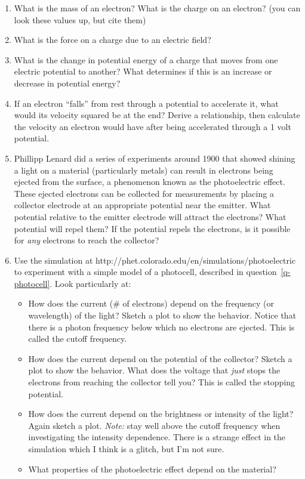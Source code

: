 \documentclass{tufte-handout}
\begin{document}
\begin{enumerate}

\item What is the mass of an electron? What is the charge on an electron? (you can look these values up, but cite them)

\item What is the force on a charge due to an electric field?

\item What is the change in potential energy of a charge that moves from one electric potential to another?  What determines if this is an increase or decrease in potential energy?

\item \label{q-velocity} If an electron ``falls'' from rest through a potential to accelerate it, what would its velocity squared be at the end? Derive a relationship, then calculate the velocity an electron would have after
being accelerated through a 1 volt potential.


\item \label{q-photocell} Phillipp Lenard did a series of experiments around 1900 that showed shining a light on a material (particularly metals) can result in electrons being ejected from the surface, a phenomenon known as the photoelectric effect.  These ejected electrons can be collected for measurements by placing a collector electrode at an appropriate potential near the emitter.  What potential relative to the emitter electrode will attract the electrons?  What potential will repel them?  If the potential repels the electrons, is it possible for {\em any} electrons to reach the collector?

\item Use the simulation at http://phet.colorado.edu/en/simulations/photoelectric to experiment with a simple model of a photocell, described in question~\ref{q-photocell}.  Look particularly at:
\begin{itemize}
	\item How does the current (\# of electrons) depend on the frequency (or wavelength) of the light?  Sketch a plot to show the behavior.  Notice that there is a photon frequency below which no electrons are ejected.  This is called the cutoff frequency.
	\item How does the current depend on the potential of the collector?  Sketch a plot to show the behavior.  What does the voltage that {\em just} stops the electrons from reaching the collector tell you?  This is called the stopping potential.
	\item How does the current depend on the brightness or intensity of the light? Again sketch a plot.  {\em Note:} stay well above the cutoff frequency when investigating the intensity dependence.  There is a strange effect in the simulation which I think is a glitch, but I'm not sure.
	\item What properties of the photoelectric effect depend on the material?
\end{itemize}


\end{enumerate}
\end{document}

